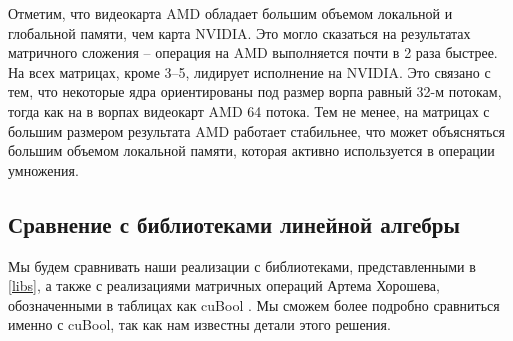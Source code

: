 \documentclass[14pt]{extarticle}
\begin{document}
	Отметим, что видеокарта AMD обладает б\emph{о}льшим объемом локальной и глобальной памяти, чем карта NVIDIA. Это могло сказаться на результатах матричного сложения -- операция на AMD выполняется почти в 2 раза быстрее. На всех матрицах, кроме 3--5, лидирует исполнение на NVIDIA. Это связано с тем, что некоторые ядра ориентированы под размер ворпа равный 32-м потокам, тогда как на в ворпах видеокарт AMD 64 потока. Тем не менее, на матрицах с большим размером результата AMD работает стабильнее, что может объясняться большим объемом локальной памяти, которая активно используется в операции умножения.

	\subsection{Сравнение с библиотеками линейной алгебры}
	
	
	Мы будем сравнивать наши реализации с библиотеками, представленными в \ref{libs}, а также с реализациями матричных операций Артема Хорошева, обозначенными в таблицах как cuBool \cite{cubool}. Мы сможем более подробно сравниться именно с cuBool, так как нам известны детали этого решения. 
	
\end{document}
